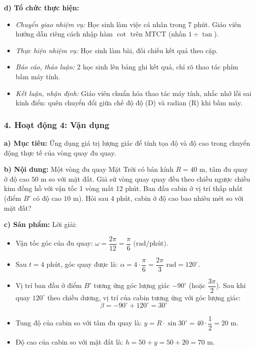 \documentclass[12pt, a4paper]{article}
\begin{document}
\textbf{d) Tổ chức thực hiện:}
\begin{itemize}[leftmargin=0.6cm]
    \item \textit{Chuyển giao nhiệm vụ:} Học sinh làm việc cá nhân trong 7 phút. Giáo viên hướng dẫn riêng cách nhập hàm $\cot$ trên MTCT (nhấn $1 \div \tan$).
    \item \textit{Thực hiện nhiệm vụ:} Học sinh làm bài, đối chiếu kết quả theo cặp.
    \item \textit{Báo cáo, thảo luận:} 2 học sinh lên bảng ghi kết quả, chỉ rõ thao tác phím bấm máy tính.
    \item \textit{Kết luận, nhận định:} Giáo viên chuẩn hóa thao tác máy tính, nhắc nhở lỗi sai kinh điển: quên chuyển đổi giữa chế độ độ (D) và radian (R) khi bấm máy.
\end{itemize}

\subsubsection*{4. Hoạt động 4: Vận dụng}
\textbf{a) Mục tiêu:} Ứng dụng giá trị lượng giác để tính tọa độ và độ cao trong chuyển động thực tế của vòng quay đu quay.

\textbf{b) Nội dung:} Một vòng đu quay Mặt Trời có bán kính $R = 40\text{ m}$, tâm đu quay ở độ cao $50\text{ m}$ so với mặt đất. Giả sử vòng quay quay đều theo chiều ngược chiều kim đồng hồ với vận tốc 1 vòng mất 12 phút. Ban đầu cabin ở vị trí thấp nhất (điểm $B'$ có độ cao $10\text{ m}$). Hỏi sau 4 phút, cabin ở độ cao bao nhiêu mét so với mặt đất?

\textbf{c) Sản phẩm:} Lời giải:
\begin{itemize}[leftmargin=0.6cm]
    \item Vận tốc góc của đu quay: $\omega = \dfrac{2\pi}{12} = \dfrac{\pi}{6}\text{ (rad/phút)}$.
    \item Sau $t = 4\text{ phút}$, góc quay được là: $\alpha = 4 \cdot \dfrac{\pi}{6} = \dfrac{2\pi}{3}\text{ rad} = 120^\circ$.
    \item Vị trí ban đầu ở điểm $B'$ tương ứng góc lượng giác $-90^\circ$ (hoặc $\dfrac{3\pi}{2}$). Sau khi quay $120^\circ$ theo chiều dương, vị trí của cabin tương ứng với góc lượng giác:
    $$\beta = -90^\circ + 120^\circ = 30^\circ$$
    \item Tung độ của cabin so với tâm đu quay là: $y = R \cdot \sin 30^\circ = 40 \cdot \dfrac{1}{2} = 20\text{ m}$.
    \item Độ cao của cabin so với mặt đất là: $h = 50 + y = 50 + 20 = 70\text{ m}$.
\end{itemize}
\end{document}
